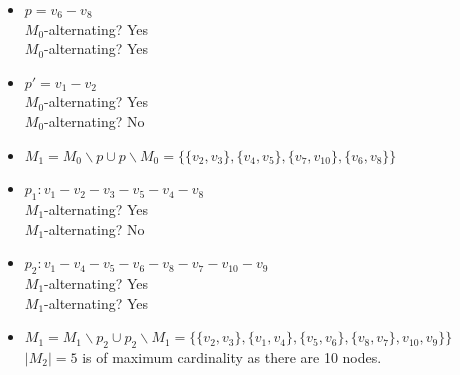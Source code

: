 \begin{itemize}
	\item{$p=v_{6} - v_{8}$\\$M_{0}$-alternating? Yes \\$M_{0}$-alternating? Yes}
	\item{$p'=v_{1} - v_{2}$\\$M_{0}$-alternating? Yes \\$M_{0}$-alternating? No}
	\item{$M_{1} = M_{0} \smallsetminus p \cup p \smallsetminus M_{0} = \{\{v_{2}, v_{3}\},
	\{v_{4}, v_{5}\}, \{v_{7}, v_{10}\}, \{v_{6}, v_{8}\}\}$}
	\item{$p_{1}: v_{1} - v_{2} - v_{3} - v_{5} - v_{4} -
	v_{8}$\\$M_{1}$-alternating? Yes \\ $M_{1}$-alternating? No}
	\item{$p_{2}: v_{1} - v_{4} - v_{5} - v_{6} - v_{8} -
	v_{7} - v_{10} - v_{9}$\\$M_{1}$-alternating? Yes \\ $M_{1}$-alternating? Yes}
	\item{$M_{1} = M_{1} \smallsetminus p_{2} \cup p_{2} \smallsetminus M_{1} = \{\{v_{2},
	v_{3}\}, \{v_{1}, v_{4}\}, \{v_{5}, v_{6}\}, \{v_{8}, v_{7}\}, v_{10},
	v_{9}\}\}$}\\ $|M_{2}| = 5$ is of maximum cardinality as there are 10 nodes.
\end{itemize}
